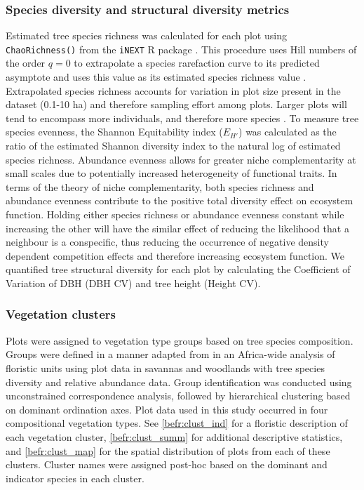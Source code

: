 \begin{refsection}
\subsubsection{Species diversity and structural diversity metrics}
\label{befr:sssec:diversity}

Estimated tree species richness was calculated for each plot using \texttt{ChaoRichness()} from the \texttt{iNEXT} R package \citep{Hsieh2016}. This procedure uses Hill numbers of the order $q=0$ to extrapolate a species rarefaction curve to its predicted asymptote and uses this value as its estimated species richness value \citep{Jost2006}. Extrapolated species richness accounts for variation in plot size present in the dataset (0.1-10 ha) and therefore sampling effort among plots. Larger plots will tend to encompass more individuals, and therefore more species \citep{Dengler2009}. To measure tree species evenness, the Shannon Equitability index ($E_{H'}$) \citep{Smith1996} was calculated as the ratio of the estimated Shannon diversity index to the natural log of estimated species richness. Abundance evenness allows for greater niche complementarity at small scales due to potentially increased heterogeneity of functional traits. In terms of the theory of niche complementarity, both species richness and abundance evenness contribute to the positive total diversity effect on ecosystem function. Holding either species richness or abundance evenness constant while increasing the other will have the similar effect of reducing the likelihood that a neighbour is a conspecific, thus reducing the occurrence of negative density dependent competition effects and therefore increasing ecosystem function. We quantified tree structural diversity for each plot by calculating the Coefficient of Variation of DBH (DBH CV) and tree height (Height CV). 

\subsubsection{Vegetation clusters}
\label{befr:sssec:clusters}

Plots were assigned to vegetation type groups based on tree species composition. Groups were defined in a manner adapted from \citet{Fayolle2018} in an Africa-wide analysis of floristic units using plot data in savannas and woodlands with tree species diversity and relative abundance data. Group identification was conducted using unconstrained correspondence analysis, followed by hierarchical clustering based on dominant ordination axes. Plot data used in this study occurred in four compositional vegetation types. See \autoref{befr:clust_ind} for a floristic description of each vegetation cluster, \autoref{befr:clust_summ} for additional descriptive statistics, and \autoref{befr:clust_map} for the spatial distribution of plots from each of these clusters. Cluster names were assigned post-hoc based on the dominant and indicator species in each cluster.


\end{refsection}
